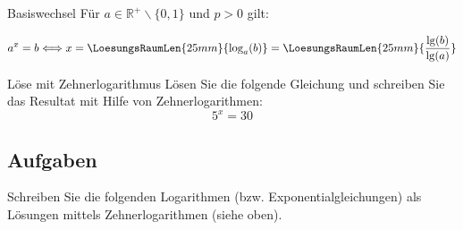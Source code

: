 \begin{gesetz}{Basiswechsel}{}
  Für $a\in\mathbb{R}^{+}\backslash\{0,1\}$ und $p>0$ gilt:

  $$a^x=b \Longleftrightarrow x= \LoesungsRaumLen{25mm}{\log_a(b)} = \LoesungsRaumLen{25mm}{\frac{\lg(b)}{\lg(a)}}$$
\end{gesetz}





\begin{beispiel}{Löse mit Zehnerlogarithmus}{}
  Lösen Sie die folgende Gleichung und schreiben Sie das Resultat mit
  Hilfe von Zehnerlogarithmen:
  $$5^x = 30$$
\end{beispiel}
\newpage

\subsection*{Aufgaben}

Schreiben Sie die folgenden Logarithmen (bzw. Exponentialgleichungen)
als Lösungen mittels Zehnerlogarithmen (siehe oben).

